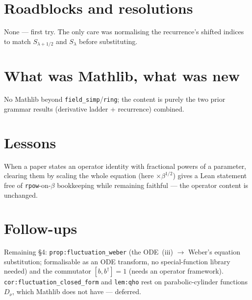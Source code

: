 \documentclass[11pt]{article}
\begin{document}
\section{Roadblocks and resolutions}
None --- first try. The only care was normalising the recurrence's shifted indices to match
$S_{\lambda+1/2}$ and $S_\lambda$ before substituting.

\section{What was Mathlib, what was new}
No Mathlib beyond \texttt{field\_simp}/\texttt{ring}; the content is purely the two prior grammar
results (derivative ladder + recurrence) combined.

\section{Lessons}
When a paper states an operator identity with fractional powers of a parameter, clearing them by
scaling the whole equation (here $\times\beta^{1/2}$) gives a Lean statement free of
\texttt{rpow}-on-$\beta$ bookkeeping while remaining faithful --- the operator content is unchanged.

\section{Follow-ups}
Remaining \S4: \texttt{prop:fluctuation\_weber} (the ODE~(iii) $\to$ Weber's equation substitution;
formalisable as an ODE transform, no special-function library needed) and the commutator
$[b,b^\dagger]=1$ (needs an operator framework). \texttt{cor:fluctuation\_closed\_form} and
\texttt{lem:qho} rest on parabolic-cylinder functions $D_\nu$, which Mathlib does not have --- deferred.
\end{document}
